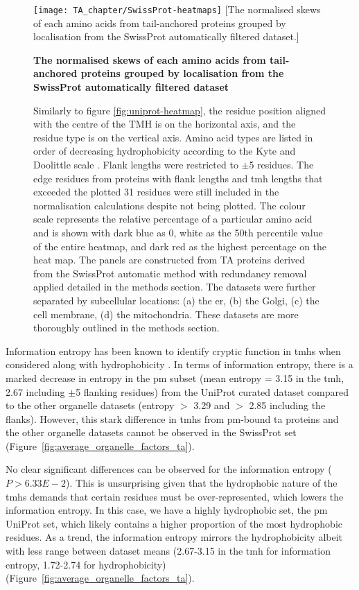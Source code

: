 \begin{figure}
\centering
\texttt{[image: TA\_chapter/SwissProt-heatmaps]}
[The normalised skews of each amino acids from tail\--anchored proteins grouped by localisation from the SwissProt automatically filtered dataset.]
{\textbf{The normalised skews of each amino acids from tail\--anchored proteins grouped by localisation from the SwissProt automatically filtered dataset}

Similarly to figure \ref{fig:uniprot-heatmap}, the residue position aligned with the centre of the TMH is on the horizontal axis, and the residue type is on the vertical axis.
Amino acid types are listed in order of decreasing hydrophobicity according to the Kyte and Doolittle scale \cite{Kyte1982}.
Flank lengths were restricted to $\pm$5 residues.
The edge residues from proteins with flank lengths and \gls{tmh} lengths that exceeded the plotted 31 residues were still included in the normalisation calculations despite not being plotted.
The colour scale represents the relative percentage of a particular amino acid and is shown with dark blue as 0, white as the 50th percentile value of the entire heatmap, and dark red as the highest percentage on the heat map.
The panels are constructed from TA proteins derived from the SwissProt automatic method with redundancy removal applied detailed in the methods section.
The datasets were further separated by subcellular locations: (a) the \gls{er}, (b) the Golgi, (c) the cell membrane, (d) the mitochondria.
These datasets are more thoroughly outlined in the methods section.
}

\label{fig:swissprot-heatmap}
\end{figure}

Information entropy has been known to identify cryptic function in \gls{tmh}s when considered along with hydrophobicity \cite{Wong2011, Wong2012}.
In terms of information entropy, there is a marked decrease in entropy in the \gls{pm} subset (mean entropy = 3.15 in the \gls{tmh}, 2.67 including $\pm$5 flanking residues) from the UniProt curated dataset compared to the other organelle datasets (entropy $>$ 3.29 and $>$ 2.85 including the flanks).
However, this stark difference in \gls{tmh}s from \gls{pm}\--bound \gls{ta} proteins and the other organelle datasets cannot be observed in the SwissProt set (Figure~\ref{fig:average_organelle_factors_ta}).

No clear significant differences can be observed for the information entropy ($P>6.33E-2$).
This is unsurprising given that the hydrophobic nature of the \gls{tmh}s demands that certain residues must be over-represented, which lowers the information entropy.
In this case, we have a highly hydrophobic set, the \gls{pm} UniProt set, which likely contains a higher proportion of the most hydrophobic residues.
As a trend, the information entropy mirrors the hydrophobicity albeit with less range between dataset means (2.67-3.15 in the \gls{tmh} for information entropy, 1.72-2.74 for hydrophobicity)(Figure~\ref{fig:average_organelle_factors_ta}).


